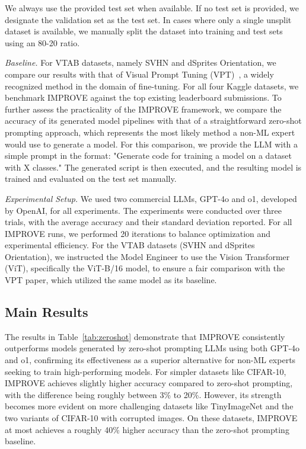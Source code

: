 We always use the provided test set when available. If no test set is provided, we designate the validation set as the test set. In cases where only a single unsplit dataset is available, we manually split the dataset into training and test sets using an 80-20 ratio.

\textit{Baseline.} 
For VTAB datasets, namely SVHN and dSprites Orientation, we compare our results with that of Visual Prompt Tuning (VPT)~\citep{jia2022vpt}, a widely recognized method in the domain of fine-tuning. For all four Kaggle datasets, we benchmark IMPROVE against the top existing leaderboard submissions. To further assess the practicality of the IMPROVE framework, we compare the accuracy of its generated model pipelines with that of a straightforward zero-shot prompting approach, which represents the most likely method a non-ML expert would use to generate a model. For this comparison, we provide the LLM with a simple prompt in the format: "Generate code for training a model on a dataset with X classes." The generated script is then executed, and the resulting model is trained and evaluated on the test set manually.

\textit{Experimental Setup.}
We used two commercial LLMs, GPT-4o and o1, developed by OpenAI, for all experiments. The experiments were conducted over three trials, with the average accuracy and their standard deviation reported. For all IMPROVE runs, we performed 20 iterations to balance optimization and experimental efficiency. For the VTAB datasets (SVHN and dSprites Orientation), we instructed the Model Engineer to use the Vision Transformer (ViT), specifically the ViT-B/16 model, to ensure a fair comparison with the VPT paper, which utilized the same model as its baseline.

\subsection{Main Results}
The results in Table~\ref{tab:zeroshot} demonstrate that IMPROVE consistently outperforms models generated by zero-shot prompting LLMs using both GPT-4o and o1, confirming its effectiveness as a superior alternative for non-ML experts seeking to train high-performing models. For simpler datasets like CIFAR-10, IMPROVE achieves slightly higher accuracy compared to zero-shot prompting, with the difference being roughly between 3\% to 20\%. However, its strength becomes more evident on more challenging datasets like TinyImageNet and the two variants of CIFAR-10 with corrupted images. On these datasets, IMPROVE at most achieves a roughly 40\% higher accuracy than the zero-shot prompting baseline. 

